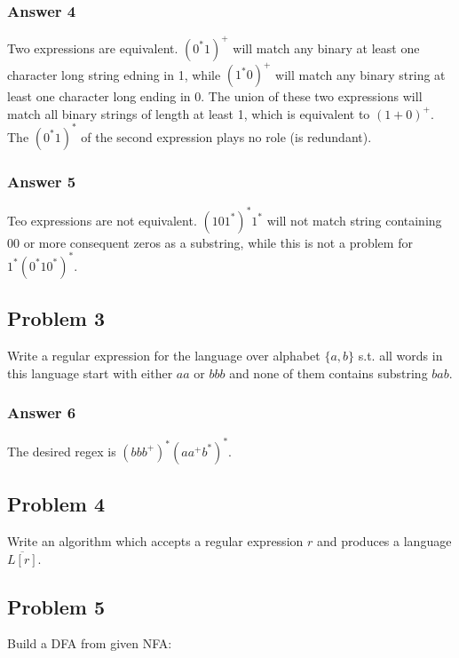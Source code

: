 \documentclass[11pt]{article}
\begin{document}
\subsubsection{Answer 4}
\label{sec:orgheadline6}
Two expressions are equivalent.  \((0^*1)^+\) will match any binary at least
one character long string edning in 1, while \((1^*0)^+\) will match any
binary string at least one character long ending in 0.  The union of these
two expressions will match all binary strings of length at least 1, which is
equivalent to \((1+0)^+\).  The \((0^*1)^*\) of the second expression plays no
role (is redundant).

\subsubsection{Answer 5}
\label{sec:orgheadline7}
Teo expressions are not equivalent.  \((101^*)^*1^*\) will not match string
containing 00 or more consequent zeros as a substring, while this is not a
problem for \(1^*(0^*10^*)^*\).

\subsection{Problem 3}
\label{sec:orgheadline10}
Write a regular expression for the language over alphabet \(\{a,b\}\) s.t. all
words in this language start with either \(aa\) or \(bbb\) and none of them
contains substring \(bab\).

\subsubsection{Answer 6}
\label{sec:orgheadline9}
The desired regex is \((bbb^+)^*(aa^+b^*)^*\).

\subsection{Problem 4}
\label{sec:orgheadline11}
Write an algorithm which accepts a regular expression \(r\) and produces a
language \(\overline{L[r]}\).

\subsection{Problem 5}
\label{sec:orgheadline13}
Build a DFA from given NFA:
\end{document}
